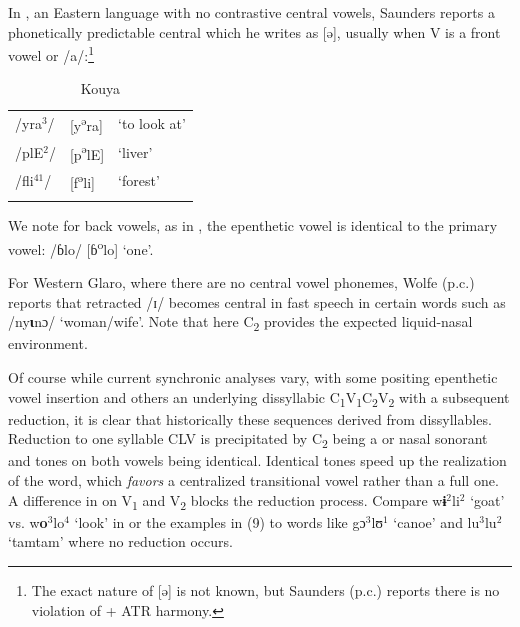 \documentclass[output=paper,newtxmath,modfonts,nonflat,draft]{langsci/langscibook}
\begin{document}
In , an Eastern language with no contrastive central vowels, Saunders reports a phonetically predictable central  which he writes as [ə], {usually when V is a front vowel or /a/}:\footnote{The exact nature of [ə] is not known, but Saunders (p.c.) reports there is no violation of + ATR harmony.}

\begin{table}
\caption{Kouya \citep{Saunders2009}}
\label{tab:zogbo:21}
	\begin{tabular}{p{1.5cm}ll}
\lsptoprule
{/yra}{$^3$}{/} &   {[y}{\textsuperscript{ə}}{ra]} & {‘to look at’}\\

{/plE}{$^2$}{/}  &  {[p}{\textsuperscript{ə}}{lE]} & {‘liver’} \\

{/fli}{$^{41}$}{/}  &  {[f}{\textsuperscript{ə}}{li]} & {‘forest’} \\
\lspbottomrule
	\end{tabular}
\end{table}

We note for back vowels, as in , the epenthetic vowel is identical to the primary vowel: /ɓlo/ [ɓ\textsuperscript{o}lo] ‘one’.  

For Western Glaro, where there are no central vowel phonemes, Wolfe (p.c.) reports that retracted /ɪ/ becomes central in fast speech in certain words such as /ny\textbf{ɩ}nɔ/ ‘woman/wife’. Note that here C\textsubscript{2} provides the expected liquid-nasal environment. 

Of course while current synchronic analyses vary, with some positing epenthetic vowel insertion and others an underlying dissyllabic C\textsubscript{1}V\textsubscript{1}C\textsubscript{2}V\textsubscript{2} with a subsequent reduction, it is clear that historically these sequences derived from dissyllables. Reduction to one syllable CLV is precipitated by C\textsubscript{2} being a  or nasal sonorant and tones on both vowels being identical. Identical tones speed up the realization of the word, which \textit{favors} a centralized transitional vowel rather than a full one.  A difference in  on V\textsubscript{1} and V\textsubscript{2} blocks the reduction process.  Compare w\textbf{ɨ$^2$}li$^2$ ‘goat’ vs. w\textbf{o$^3$}lo$^4$ ‘look’ in  \citep[20, 31]{Seri1987} or the  examples in (9) to words like gɔ$^3$lʊ$^1$ ‘canoe’ and lu$^3$lu$^2$ ‘tamtam’ where no reduction occurs.   
\end{document}
